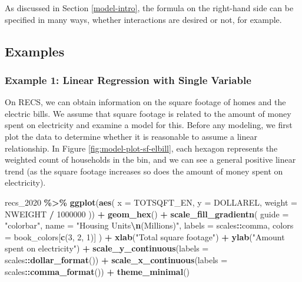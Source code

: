 \documentclass[
]{krantz}
\makeatletter
\newenvironment{Shaded}{\begin{snugshade}}{\end{snugshade}}
\newcommand{\AttributeTok}[1]{\textcolor[rgb]{0.27,0.27,0.27}{#1}}
\newcommand{\DecValTok}[1]{\textcolor[rgb]{0.06,0.06,0.06}{#1}}
\newcommand{\FunctionTok}[1]{\textcolor[rgb]{0.27,0.27,0.27}{\textbf{#1}}}
\newcommand{\NormalTok}[1]{#1}
\newcommand{\SpecialCharTok}[1]{\textcolor[rgb]{0.43,0.43,0.43}{\textbf{#1}}}
\newcommand{\StringTok}[1]{\textcolor[rgb]{0.5,0.5,0.5}{#1}}
\newenvironment{kframe}{%
\medskip{}
\setlength{\fboxsep}{.8em}
 \def\at@end@of@kframe{}%
 \ifinner\ifhmode%
  \def\at@end@of@kframe{\end{minipage}}%
  \begin{minipage}{\columnwidth}%
 \fi\fi%
 \def\FrameCommand##1{\hskip\@totalleftmargin \hskip-\fboxsep
 \colorbox{shadecolor}{##1}\hskip-\fboxsep
     \hskip-\linewidth \hskip-\@totalleftmargin \hskip\columnwidth}%
 \MakeFramed {\advance\hsize-\width
   \@totalleftmargin\z@ \linewidth\hsize
   \@setminipage}}%
 {\par\unskip\endMakeFramed%
 \at@end@of@kframe}
\renewenvironment{Shaded}{\begin{kframe}}{\end{kframe}}
\makeatother
\begin{document}
As discussed in Section \ref{model-intro}, the formula on the right-hand side can be specified in many ways, whether interactions are desired or not, for example.

\hypertarget{examples-7}{%
\subsection{Examples}\label{examples-7}}

\hypertarget{example-1-linear-regression-with-single-variable}{%
\subsubsection*{Example 1: Linear Regression with Single Variable}\label{example-1-linear-regression-with-single-variable}}


On RECS, we can obtain information on the square footage of homes and the electric bills. We assume that square footage is related to the amount of money spent on electricity and examine a model for this. Before any modeling, we first plot the data to determine whether it is reasonable to assume a linear relationship. In Figure \ref{fig:model-plot-sf-elbill}, each hexagon represents the weighted count of households in the bin, and we can see a general positive linear trend (as the square footage increases so does the amount of money spent on electricity).

\begin{Shaded}
\begin{Highlighting}[]
\NormalTok{recs\_2020 }\SpecialCharTok{\%\textgreater{}\%}
  \FunctionTok{ggplot}\NormalTok{(}\FunctionTok{aes}\NormalTok{(}
    \AttributeTok{x =}\NormalTok{ TOTSQFT\_EN,}
    \AttributeTok{y =}\NormalTok{ DOLLAREL,}
    \AttributeTok{weight =}\NormalTok{ NWEIGHT }\SpecialCharTok{/} \DecValTok{1000000}
\NormalTok{  )) }\SpecialCharTok{+}
  \FunctionTok{geom\_hex}\NormalTok{() }\SpecialCharTok{+}
  \FunctionTok{scale\_fill\_gradientn}\NormalTok{(}
    \AttributeTok{guide =} \StringTok{"colorbar"}\NormalTok{,}
    \AttributeTok{name =} \StringTok{"Housing Units}\SpecialCharTok{\textbackslash{}n}\StringTok{(Millions)"}\NormalTok{,}
    \AttributeTok{labels =}\NormalTok{ scales}\SpecialCharTok{::}\NormalTok{comma,}
    \AttributeTok{colors =}\NormalTok{ book\_colors[}\FunctionTok{c}\NormalTok{(}\DecValTok{3}\NormalTok{, }\DecValTok{2}\NormalTok{, }\DecValTok{1}\NormalTok{)]}
\NormalTok{  ) }\SpecialCharTok{+}
  \FunctionTok{xlab}\NormalTok{(}\StringTok{"Total square footage"}\NormalTok{) }\SpecialCharTok{+}
  \FunctionTok{ylab}\NormalTok{(}\StringTok{"Amount spent on electricity"}\NormalTok{) }\SpecialCharTok{+}
  \FunctionTok{scale\_y\_continuous}\NormalTok{(}\AttributeTok{labels =}\NormalTok{ scales}\SpecialCharTok{::}\FunctionTok{dollar\_format}\NormalTok{()) }\SpecialCharTok{+}
  \FunctionTok{scale\_x\_continuous}\NormalTok{(}\AttributeTok{labels =}\NormalTok{ scales}\SpecialCharTok{::}\FunctionTok{comma\_format}\NormalTok{()) }\SpecialCharTok{+}
  \FunctionTok{theme\_minimal}\NormalTok{()}
\end{Highlighting}
\end{Shaded}
\end{document}
